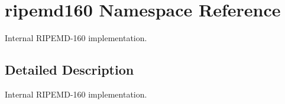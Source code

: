 \hypertarget{namespaceripemd160}{}\section{ripemd160 Namespace Reference}
\label{namespaceripemd160}


Internal R\+I\+P\+E\+M\+D-\/160 implementation.  




\subsection{Detailed Description}
Internal R\+I\+P\+E\+M\+D-\/160 implementation. 